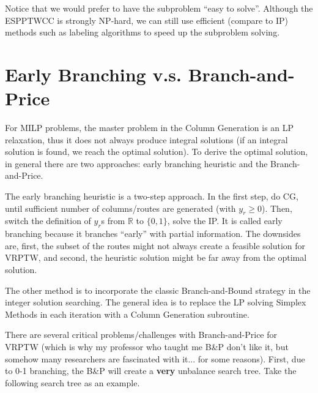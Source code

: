                 Notice that we would prefer to have the subproblem ``easy to solve''. Although the ESPPTWCC is strongly NP-hard, we can still use efficient (compare to IP) methods such as labeling algorithms to speed up the subproblem solving.

        \section{Early Branching v.s. Branch-and-Price}
            For MILP problems, the master problem in the Column Generation is an LP relaxation, thus it does not always produce integral solutions (if an integral solution is found, we reach the optimal solution). To derive the optimal solution, in general there are two approaches: early branching heuristic and the Branch-and-Price.

            The early branching heuristic is a two-step approach. In the first step, do CG, until sufficient number of columns/routes are generated (with $y_r \ge 0$). Then, switch the definition of $y_r$s from $\mathbb{R}$ to $\{0, 1\}$, solve the IP. It is called early branching because it branches ``early'' with partial information. The downsides are, first, the subset of the routes might not always create a feasible solution for VRPTW, and second, the heuristic solution might be far away from the optimal solution.

            The other method is to incorporate the classic Branch-and-Bound strategy in the integer solution searching. The general idea is to replace the LP solving Simplex Methods in each iteration with a Column Generation subroutine.

            There are several critical problems/challenges with Branch-and-Price for VRPTW (which is why my professor who taught me B\&P don't like it, but somehow many researchers are fascinated with it... for some reasons). First, due to 0-1 branching, the B\&P will create a \textbf{very} unbalance search tree. Take the following search tree as an example.

            \begin{figure}[h!]
                \centering
            \end{figure}

